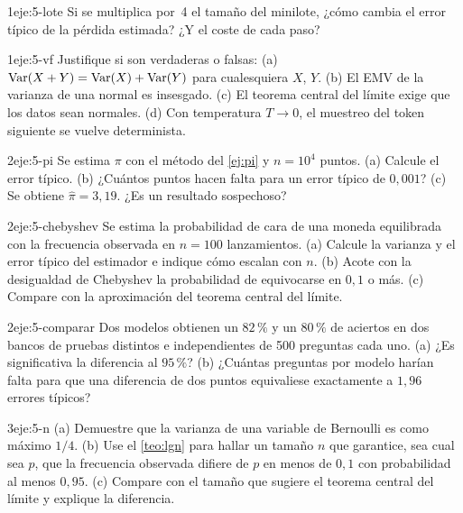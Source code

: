 \begin{ejercicio}{1}{eje:5-lote}
Si se multiplica por~4 el tamaño del minilote, ¿cómo cambia el error típico de la pérdida estimada? ¿Y el coste de cada paso?
\end{ejercicio}

\begin{ejercicio}{1}{eje:5-vf}
Justifique si son verdaderas o falsas: (a) $\operatorname{Var}(X+Y)=\operatorname{Var}(X)+\operatorname{Var}(Y)$ para cualesquiera $X$, $Y$. (b) El EMV de la varianza de una normal es insesgado. (c) El teorema central del límite exige que los datos sean normales. (d) Con temperatura $T\to 0$, el muestreo del token siguiente se vuelve determinista.
\end{ejercicio}

\begin{ejercicio}{2}{eje:5-pi}
Se estima $\pi$ con el método del \cref{ej:pi} y $n=10^{4}$ puntos. (a) Calcule el error típico. (b) ¿Cuántos puntos hacen falta para un error típico de $0{,}001$? (c) Se obtiene $\hat\pi=3{,}19$. ¿Es un resultado sospechoso?
\end{ejercicio}

\begin{ejercicio}{2}{eje:5-chebyshev}
Se estima la probabilidad de cara de una moneda equilibrada con la frecuencia observada en $n=100$ lanzamientos. (a) Calcule la varianza y el error típico del estimador e indique cómo escalan con $n$. (b) Acote con la desigualdad de Chebyshev la probabilidad de equivocarse en $0{,}1$ o más. (c) Compare con la aproximación del teorema central del límite.
\end{ejercicio}

\begin{ejercicio}{2}{eje:5-comparar}
Dos modelos obtienen un $82\,\%$ y un $80\,\%$ de aciertos en dos bancos de pruebas distintos e independientes de 500 preguntas cada uno. (a) ¿Es significativa la diferencia al $95\,\%$? (b) ¿Cuántas preguntas por modelo harían falta para que una diferencia de dos puntos equivaliese exactamente a $1{,}96$ errores típicos?
\end{ejercicio}

\begin{ejercicio}{3}{eje:5-n}
(a) Demuestre que la varianza de una variable de Bernoulli es como máximo $1/4$. (b) Use el \cref{teo:lgn} para hallar un tamaño $n$ que garantice, sea cual sea $p$, que la frecuencia observada difiere de $p$ en menos de $0{,}1$ con probabilidad al menos $0{,}95$. (c) Compare con el tamaño que sugiere el teorema central del límite y explique la diferencia.
\end{ejercicio}
